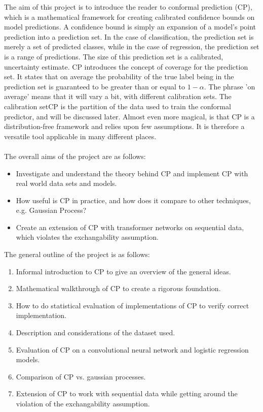 The aim of this project is to introduce the reader to conformal prediction (CP), which is a mathematical framework for creating calibrated confidence bounds on model predictions. A confidence bound is simply an expansion of a model's point prediction into a prediction set. In the case of classification, the prediction set is merely a set of predicted classes, while in the case of regression, the prediction set is a range of predictions. The size of this prediction set is a calibrated, uncertainty estimate.
%
CP introduces the concept of coverage for the prediction set. It states that on average the probability of the true label being in the prediction set is guaranteed to be greater than or equal to $1-\alpha$. The phrase 'on average' means that it will vary a bit, with different calibration sets. The calibration setCP is the partition of the data used to train the conformal predictor, and will be discussed later. 
%
%
%
Almost even more magical, is that CP is a distribution-free framework and relies upon few assumptions. It is therefore a versatile tool applicable in many different places.
\\
\\
The overall aims of the project are as follows:
\begin{itemize}
    \item Investigate and understand the theory behind CP and implement CP with real world data sets and models.
    \item How useful is CP in practice, and how does it compare to other techniques, e.g. Gaussian Process?
    \item Create an extension of CP with transformer networks on sequential data, which violates the exchangability assumption.
\end{itemize}

The general outline of the project is as follows:
\begin{enumerate}
    \item Informal introduction to CP to give an overview of the general ideas.
    \item Mathematical walkthrough of CP to create a rigorous foundation. 
    \item How to do statistical evaluation of implementations of CP to verify correct implementation.
    \item Description and considerations of the dataset used.
    \item Evaluation of CP on a convolutional neural network and logistic regression models.
    \item Comparison of CP vs. gaussian processes.
    \item Extension of CP to work with sequential data while getting around the violation of the exchangability assumption.
\end{enumerate}


